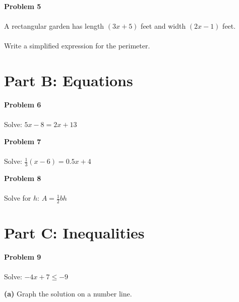 \documentclass[12pt]{article}
\begin{document}
            \vspace{2.5cm}

            \textbf{Problem 5}\\\\
            A rectangular garden has length $(3x + 5)$ feet and width $(2x - 1)$ feet.\\\\
            Write a simplified expression for the perimeter.

            \newpage

        \section*{Part B: Equations}

            \textbf{Problem 6}\\\\
            Solve: $5x - 8 = 2x + 13$

            \vspace{4cm}

            \textbf{Problem 7}\\\\
            Solve: $\displaystyle\frac{1}{3}(x - 6) = 0.5x + 4$

            \vspace{4cm}

            \textbf{Problem 8}\\\\
            Solve for $h$: $\displaystyle A = \frac{1}{2}bh$

            \newpage

        \section*{Part C: Inequalities}

            \textbf{Problem 9}\\\\
            Solve: $-4x + 7 \leq -9$

            \vspace{3cm}

            \textbf{(a)} Graph the solution on a number line.

            \vspace{0.5cm}

            \begin{center}
            \end{center}
\end{document}
